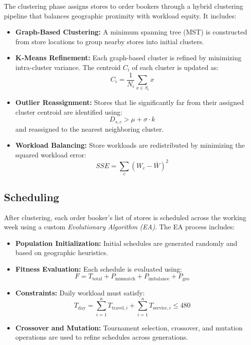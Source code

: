 The clustering phase assigns stores to order bookers through a hybrid clustering pipeline that balances geographic proximity with workload equity. It includes:

\begin{itemize}
  \item \textbf{Graph-Based Clustering:} A minimum spanning tree (MST) is constructed from store locations to group nearby stores into initial clusters.
  \item \textbf{K-Means Refinement:} Each graph-based cluster is refined by minimizing intra-cluster variance. The centroid $C_i$ of each cluster is updated as:
  \[
  C_i = \frac{1}{N_i} \sum_{x \in S_i} x
  \]
  \item \textbf{Outlier Reassignment:} Stores that lie significantly far from their assigned cluster centroid are identified using:
  \[
  D_{s,c} > \mu + \sigma \cdot k
  \]
  and reassigned to the nearest neighboring cluster.
  \item \textbf{Workload Balancing:} Store workloads are redistributed by minimizing the squared workload error:
  \[
  SSE = \sum_{c} (W_c - \bar{W})^2
  \]
\end{itemize}

\subsection{Scheduling}

After clustering, each order booker's list of stores is scheduled across the working week using a custom \textit{Evolutionary Algorithm (EA)}. The EA process includes:

\begin{itemize}
  \item \textbf{Population Initialization:} Initial schedules are generated randomly and based on geographic heuristics.
  \item \textbf{Fitness Evaluation:} Each schedule is evaluated using:
  \[
  F = T_{\text{total}} + P_{\text{mismatch}} + P_{\text{imbalance}} + P_{\text{geo}}
  \]
  \item \textbf{Constraints:} Daily workload must satisfy:
  \[
  T_{\text{day}} = \sum_{i=1}^{n} T_{\text{travel},i} + \sum_{i=1}^{n} T_{\text{service},i} \leq 480
  \]
  \item \textbf{Crossover and Mutation:} Tournament selection, crossover, and mutation operations are used to refine schedules across generations.
\end{itemize}

